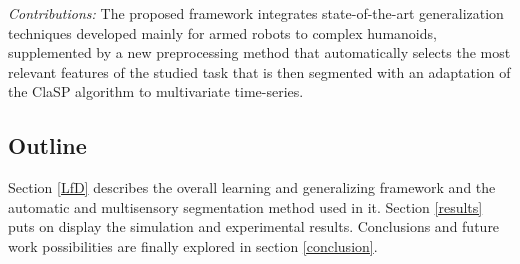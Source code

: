 \documentclass[a4paper, 10pt, conference]{ieeeconf}
\begin{document}

\textit{Contributions:} 
The proposed framework integrates state-of-the-art generalization techniques developed mainly for armed robots to complex humanoids, supplemented by a new preprocessing method that automatically selects the most relevant features of the studied task that is then segmented with an adaptation of the ClaSP \cite{clasp} algorithm to multivariate time-series.

\subsection{Outline}

Section \ref{LfD} describes the overall learning and generalizing framework and the automatic and multisensory segmentation method used in it. Section \ref{results} puts on display the simulation and experimental results. Conclusions and future work possibilities are finally explored in section \ref{conclusion}.




\end{document}
